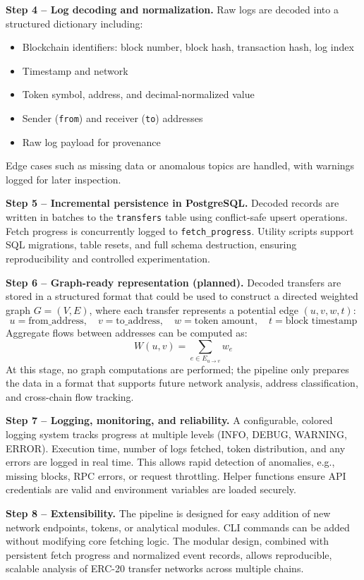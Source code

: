 \documentclass[a4paper,12pt]{report}
\begin{document}
\textbf{Step 4 -- Log decoding and normalization.}  
Raw logs are decoded into a structured dictionary including:
\begin{itemize}
    \item Blockchain identifiers: block number, block hash, transaction hash, log index
    \item Timestamp and network
    \item Token symbol, address, and decimal-normalized value
    \item Sender (\texttt{from}) and receiver (\texttt{to}) addresses
    \item Raw log payload for provenance
\end{itemize}
Edge cases such as missing data or anomalous topics are handled, with warnings logged for later inspection.

\textbf{Step 5 -- Incremental persistence in PostgreSQL.}  
Decoded records are written in batches to the \texttt{transfers} table using conflict-safe upsert operations. Fetch progress is concurrently logged to \texttt{fetch\_progress}. Utility scripts support SQL migrations, table resets, and full schema destruction, ensuring reproducibility and controlled experimentation.

\textbf{Step 6 -- Graph-ready representation (planned).}  
Decoded transfers are stored in a structured format that could be used to construct a directed weighted graph $G=(V,E)$, where each transfer represents a potential edge $(u, v, w, t)$:
\[
u = \text{from\_address}, \quad
v = \text{to\_address}, \quad
w = \text{token amount}, \quad
t = \text{block timestamp}
\]
Aggregate flows between addresses can be computed as:
\[
W(u,v) = \sum_{e \in E_{u \rightarrow v}} w_e
\]
At this stage, no graph computations are performed; the pipeline only prepares the data in a format that supports future network analysis, address classification, and cross-chain flow tracking.

\textbf{Step 7 -- Logging, monitoring, and reliability.}  
A configurable, colored logging system tracks progress at multiple levels (INFO, DEBUG, WARNING, ERROR). Execution time, number of logs fetched, token distribution, and any errors are logged in real time. This allows rapid detection of anomalies, e.g., missing blocks, RPC errors, or request throttling. Helper functions ensure API credentials are valid and environment variables are loaded securely.

\textbf{Step 8 -- Extensibility.}  
The pipeline is designed for easy addition of new network endpoints, tokens, or analytical modules. CLI commands can be added without modifying core fetching logic. The modular design, combined with persistent fetch progress and normalized event records, allows reproducible, scalable analysis of ERC-20 transfer networks across multiple chains.
\end{document}
